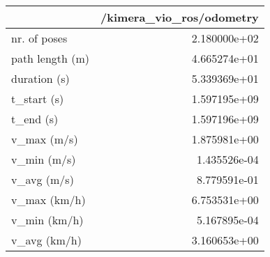\begin{tabular}{lr}
\toprule
{} &  /kimera\_vio\_ros/odometry \\
\midrule
nr. of poses    &              2.180000e+02 \\
path length (m) &              4.665274e+01 \\
duration (s)    &              5.339369e+01 \\
t\_start (s)     &              1.597195e+09 \\
t\_end (s)       &              1.597196e+09 \\
v\_max (m/s)     &              1.875981e+00 \\
v\_min (m/s)     &              1.435526e-04 \\
v\_avg (m/s)     &              8.779591e-01 \\
v\_max (km/h)    &              6.753531e+00 \\
v\_min (km/h)    &              5.167895e-04 \\
v\_avg (km/h)    &              3.160653e+00 \\
\bottomrule
\end{tabular}
